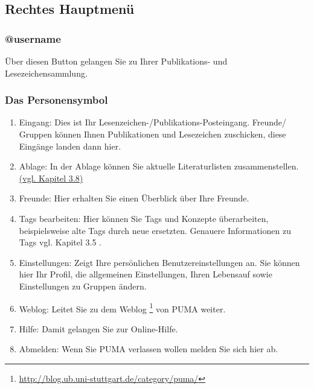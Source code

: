 \documentclass[b5paper,11pt,twoside]{scrbook} %
\begin{document}
\subsection{Rechtes Hauptmenü}
\subsubsection{@username}
Über diesen Button gelangen Sie zu Ihrer Publikations- und Lesezeichensammlung. 
\subsubsection{Das Personensymbol}
\begin{enumerate}
    \item Eingang: Dies ist Ihr Lesenzeichen-/Publikations-Posteingang. Freunde/ Gruppen können Ihnen Publikationen und Lesezeichen zuschicken, diese Eingänge landen dann hier.
    \item Ablage: In der Ablage können Sie aktuelle Literaturlisten zusammenstellen. \hyperlink{Ablage}{(vgl. Kapitel 3.8)}
    \item Freunde: Hier erhalten Sie einen Überblick über Ihre Freunde. 
    \item Tags bearbeiten: Hier können Sie Tags und Konzepte überarbeiten, beispielsweise alte Tags durch neue ersetzten. Genauere Informationen zu Tags vgl. Kapitel 3.5 .
    \item Einstellungen: Zeigt Ihre persönlichen Benutzereinstellungen an. Sie können hier Ihr Profil, die allgemeinen Einstellungen, Ihren Lebensauf sowie Einstellungen zu Gruppen ändern.
    \item Weblog: Leitet Sie zu dem Weblog \footnote{\url{http://blog.ub.uni-stuttgart.de/category/puma/}} von PUMA weiter.
    \item Hilfe: Damit gelangen Sie zur Online-Hilfe.
    \item Abmelden: Wenn Sie PUMA verlassen wollen melden Sie sich hier ab. 
\end{enumerate}
\end{document}

